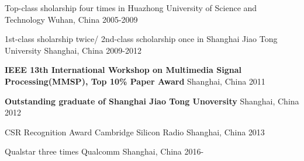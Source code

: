 



\begin{cvhonors}

  \cvhonor
    {} %
    {Top-class sholarship four times in Huazhong University of Science and Technology} %
    {Wuhan, China} %
    {2005-2009} %

  \cvhonor
    {} %
    {1st-class sholarship twice/ 2nd-class scholarship once in Shanghai Jiao Tong University} %
    {Shanghai, China} %
    {2009-2012} %

  \cvhonor
    {} %
    {\textbf{IEEE 13th International Workshop on Multimedia Signal Processing(MMSP), Top 10\% Paper Award}} %
    {Shanghai, China} %
    {2011} %

  \cvhonor
    {} %
    {\textbf{Outstanding graduate of Shanghai Jiao Tong Unoversity}} %
    {Shanghai, China} %
    {2012} %

\end{cvhonors}




\begin{cvhonors}

  \cvhonor
    {CSR Recognition Award} %
    {Cambridge Silicon Radio} %
    {Shanghai, China} %
    {2013} %

  \cvhonor
    {Qualstar three times} %
    {Qualcomm} %
    {Shanghai, China} %
    {2016-} %

\end{cvhonors}

